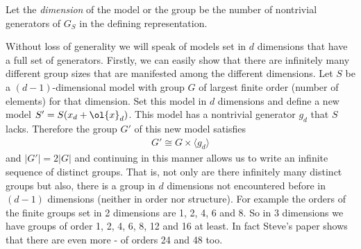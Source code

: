 \begin{definition} Let the \emph{dimension} of the model or the group be the number of nontrivial generators of $G_S$ in the defining representation.
\end{definition}
Without loss of generality we will speak of models set in $d$ dimensions that have a full set of generators. Firstly, we can easily show that there are infinitely many different group sizes that are manifested among the different dimensions. Let $S$ be a $(d-1)$-dimensional model with group $G$ of largest finite order (number of elements) for that dimension. Set this model in $d$ dimensions and define a new model $S' = S(x_d+\ol{x}_d)$. This model has a nontrivial generator $g_d$ that $S$ lacks. Therefore the group $G'$ of this new model satisfies
\begin{align}
	G' \cong G \times \langle g_d \rangle
\end{align}
and $|G'| = 2|G|$ and continuing in this manner allows us to write an infinite sequence of distinct groups. That is, not only are there infinitely many distinct groups but also, there is a group in $d$ dimensions not encountered before in $(d-1)$ dimensions (neither in order nor structure). For example the orders of the finite groups set in 2 dimensions are 1, 2, 4, 6 and 8. So in 3 dimensions we have groups of order 1, 2, 4, 6, 8, 12 and 16 at least. In fact Steve's paper shows that there are even more - of orders 24 and 48 too.

